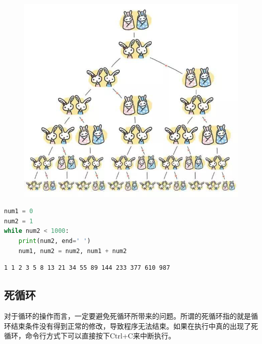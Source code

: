 \begin{figure}[H]
    \centering
    \includegraphics[scale=0.3]{img/C3/3-1/1.png}
\end{figure}

\vspace{-0.5cm}

\begin{lstlisting}[language=Python]
num1 = 0
num2 = 1
while num2 < 1000:
    print(num2, end=' ')
    num1, num2 = num2, num1 + num2
\end{lstlisting}

\begin{tcolorbox}
    \begin{verbatim}
1 1 2 3 5 8 13 21 34 55 89 144 233 377 610 987
\end{verbatim}
\end{tcolorbox}

\vspace{0.5cm}

\subsection{死循环}

对于循环的操作而言，一定要避免死循环所带来的问题。所谓的死循环指的就是循环结束条件没有得到正常的修改，导致程序无法结束。如果在执行中真的出现了死循环，命令行方式下可以直接按下Ctrl+C来中断执行。\\

